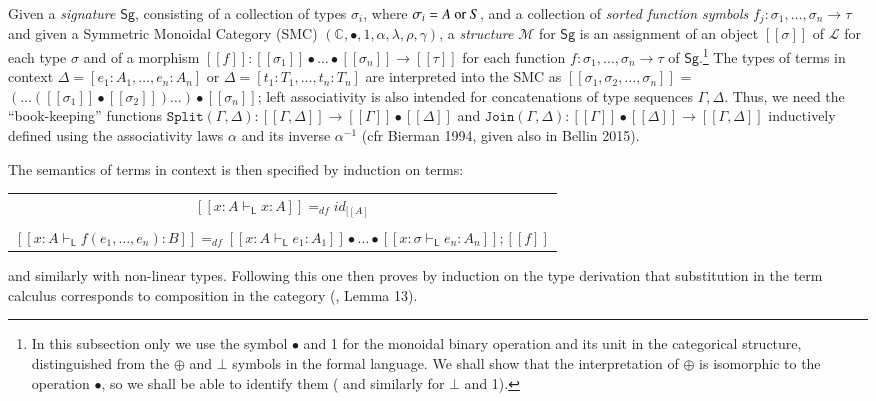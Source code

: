 \documentclass{lmcs}
\begin{document}
Given a {\em signature} $\mathsf{Sg}$, consisting of a collection of types $\sigma_i$, where $\sigma_i = A\ \hbox{or}\ S$, 
and a collection of {\em sorted function symbols} $f_j : \sigma_1, \ldots, \sigma_n \rightarrow \tau$ and given 
a Symmetric Monoidal Category (SMC) $(\mathbb{C}, \bullet, 1, \alpha, \lambda, \rho, \gamma)$,  a {\em structure} 
$\mathcal{M}$ for $\mathsf{Sg}$ is an assignment of an object $[\![\sigma]\!]$ of $\mathcal{L}$ for each type $\sigma$ and of 
a morphism $[\![f]\!] : [\![\sigma_1]\!]\bullet\ldots\bullet[\![\sigma_n]\!]\rightarrow [\![\tau]\!]$ for each function
$f : \sigma_1, \ldots, \sigma_n \rightarrow \tau$ of $\mathsf{Sg}$.\footnote{ In this subsection only we use the symbol $\bullet$
  and 1 for the monoidal binary operation and its unit in the categorical structure, distinguished from the $\oplus$ and
  $\bot$ symbols in the formal language. We shall show that the interpretation of $\oplus$ is isomorphic to the operation
  $\bullet$, so we shall be able to identify them ( and similarly for $\bot$ and 1).}  The types of terms in context $\Delta = [e_1: A_1, \ldots, e_n: A_n]$ or $\Delta = [t_1: T_1, \ldots, t_n: T_n]$ are 
interpreted into the SMC as $[\![\sigma_1, \sigma_2, \ldots, \sigma_n]\!]$ =   
$(\ldots ([\![\sigma_1]\!]\bullet[\![\sigma_2]\!])\ldots ) \bullet [\![\sigma_n]\!]$; left associativity is also 
intended for concatenations of type sequences $\Gamma, \Delta$. Thus, we need the ``book-keeping'' functions 
$\mathtt{Split}(\Gamma, \Delta): [\![\Gamma, \Delta]\!] \rightarrow [\![\Gamma]\!]\bullet [\![\Delta]\!]$ and 
$\mathtt{Join}(\Gamma, \Delta): [\![\Gamma]\!] \bullet  [\![\Delta]\!] \rightarrow [\![\Gamma, \Delta]\!]$ inductively defined 
using the associativity laws $\alpha$ and its inverse $\alpha^{-1}$ (cfr Bierman 1994, given also in Bellin 2015).  

The semantics of terms in context is then specified by induction on terms: 
\begin{center}
  \begin{tabular}{c}
    $[\![x: A\vdash_{\mathsf{L}} x: A]\!] =_{df} id_{[\![A\!]}$\\
    \\
    $[\![x: A\vdash_{\mathsf{L}}  f(e_1,\ldots, e_n): B]\!] =_{df} [\![x: A\vdash_{\mathsf{L}} e_1: A_1]\!]\bullet
    \ldots\bullet [\![x:\sigma\vdash_{\mathsf{L}} e_n: A_n]\!]; [\![ f ]\!]$
  \end{tabular}
\end{center}   
and similarly with non-linear types. 
Following this one then proves by induction on the type derivation that substitution in the term calculus 
corresponds to composition in the category (\cite{Bierman:1994}, Lemma 13). 
\end{document}
